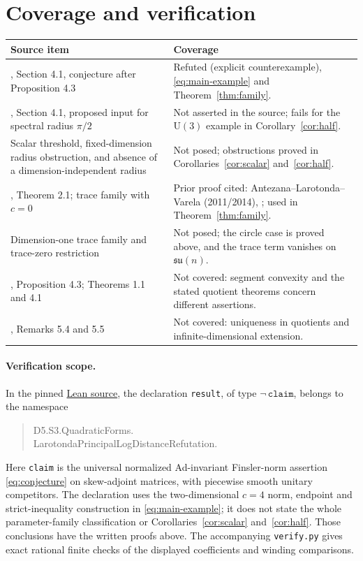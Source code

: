 \documentclass[11pt]{article}
\newcommand{\U}{\mathrm U}
\begin{document}
\section{Coverage and verification}
\begin{center}\small
\begin{tabular}{@{}p{.48\linewidth}p{.45\linewidth}@{}}
\toprule
Source item & Coverage\\
\midrule
\cite{Larotonda}, Section 4.1, conjecture after Proposition 4.3
& Refuted (explicit counterexample), \eqref{eq:main-example} and Theorem~\ref{thm:family}.\\[3pt]
\cite{Larotonda}, Section 4.1, proposed input for spectral radius $\pi/2$
& Not asserted in the source; fails for the $\U(3)$ example in Corollary~\ref{cor:half}.\\[3pt]
Scalar threshold, fixed-dimension radius obstruction, and absence of a dimension-independent radius
& Not posed; obstructions proved in Corollaries~\ref{cor:scalar} and~\ref{cor:half}.\\[3pt]
\cite{Larotonda}, Theorem 2.1; trace family with $c=0$
& Prior proof cited: Antezana--Larotonda--Varela (2011/2014), \cite[Theorem 4.3]{ALV}; used in Theorem~\ref{thm:family}.\\[3pt]
Dimension-one trace family and trace-zero restriction
& Not posed; the circle case is proved above, and the trace term vanishes on $\mathfrak{su}(n)$.\\[3pt]
\cite{Larotonda}, Proposition 4.3; Theorems 1.1 and 4.1
& Not covered: segment convexity and the stated quotient theorems concern different assertions.\\[3pt]
\cite{Larotonda}, Remarks 5.4 and 5.5
& Not covered: uniqueness in quotients and infinite-dimensional extension.\\
\bottomrule
\end{tabular}
\end{center}

\paragraph{Verification scope.}
In the pinned
\href{https://github.com/the-omega-institute/trureturing/blob/a89e0fb9ba0f9002502ec8125455c2c2a9281443/D5/S3/QuadraticForms/LarotondaPrincipalLogDistanceRefutation.lean}{Lean source},
the declaration \texttt{result}, of type $\neg\,\texttt{claim}$, belongs to
the namespace
\begin{quote}\small\ttfamily
D5.S3.QuadraticForms.\\
LarotondaPrincipalLogDistanceRefutation.
\end{quote}
Here \texttt{claim} is the universal normalized Ad-invariant Finsler-norm
assertion \eqref{eq:conjecture} on skew-adjoint matrices, with piecewise
smooth unitary competitors. The declaration uses the
two-dimensional $c=4$ norm, endpoint and strict-inequality construction
in \eqref{eq:main-example}; it does not state the whole parameter-family
classification or Corollaries~\ref{cor:scalar} and~\ref{cor:half}.
Those conclusions have the written proofs above.
The accompanying \texttt{verify.py} gives exact rational finite checks
of the displayed coefficients and winding comparisons.
\end{document}
